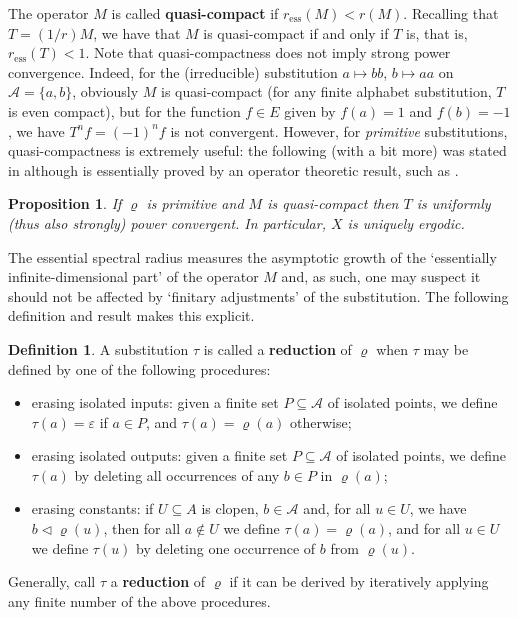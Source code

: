 \documentclass[11pt]{amsart}
\numberwithin{equation}{section}
\theoremstyle{plain}
\newtheorem{proposition}[theorem]{Proposition}
\theoremstyle{definition}
\newtheorem{definition}[theorem]{Definition}
\newcommand{\mc}{\mathcal}
\newcommand{\A}{\mc A}
\newcommand{\sub}{\varrho}
\begin{document}
The operator \(M\) is called \textbf{quasi-compact} if \(r_\mathrm{ess}(M) < r(M)\). Recalling that \(T = (1/r)M\), we have that \(M\) is quasi-compact if and only if \(T\) is, that is, \(r_\mathrm{ess}(T) < 1\). Note that quasi-compactness does not imply strong power convergence. Indeed, for the (irreducible) substitution \(a \mapsto bb\), \(b \mapsto aa\) on \(\A = \{a,b\}\), obviously \(M\) is quasi-compact (for any finite alphabet substitution, \(T\) is even compact), but for the function \(f \in E\) given by \(f(a) = 1\) and \(f(b) = -1\), we have \(T^n f = (-1)^n f\) is not convergent. However, for \emph{primitive} substitutions, quasi-compactness is extremely useful: the following (with a bit more) was stated in \cite[Proposition 6.6]{MRW25} although is essentially proved by an operator theoretic result, such as \cite[Prop.\ 5]{Abd75}.

\begin{proposition}\label{prop:QC=>UE}
If \(\sub\) is primitive and \(M\) is quasi-compact then \(T\) is uniformly (thus also strongly) power convergent. In particular, \(X\) is uniquely ergodic.
\end{proposition}

The essential spectral radius measures the asymptotic growth of the `essentially infinite-dimensional part' of the operator \(M\) and, as such, one may suspect it should not be affected by `finitary adjustments' of the substitution. The following definition and result makes this explicit.

\begin{definition}\label{def:reduced substitution}
A substitution \(\tau\) is called a \textbf{reduction} of \(\sub\) when \(\tau\) may be defined by one of the following procedures:
\begin{itemize}
	\item[(\(\varepsilon_\mathrm{in}\))] erasing isolated inputs: given a finite set \(P \subseteq \A\) of isolated points, we define \(\tau(a) = \varepsilon\) if \(a \in P\), and \(\tau(a) = \sub(a)\) otherwise;
	\item[(\(\varepsilon_\mathrm{out}\))] erasing isolated outputs: given a finite set \(P \subseteq \A\) of isolated points, we define \(\tau(a)\) by deleting all occurrences of any \(b \in P\) in \(\sub(a)\);
	\item[(\(\varepsilon_\mathrm{con}\))] erasing constants: if \(U \subseteq A\) is clopen, \(b \in \A\) and, for all \(u \in U\), we have \(b \triangleleft \sub(u)\), then for all \(a \notin U\) we define \(\tau(a) = \sub(a)\), and for all \(u \in U\) we define \(\tau(u)\) by deleting one occurrence of \(b\) from \(\sub(u)\).
\end{itemize}
Generally, call \(\tau\) a \textbf{reduction} of \(\sub\) if it can be derived by iteratively applying any finite number of the above procedures.
\end{definition}
\end{document}
